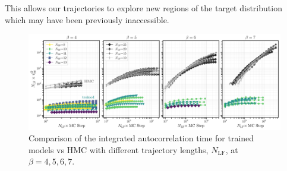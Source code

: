 \documentclass[a4paper,11pt]{article}
\begin{document}
%
This allows our trajectories to explore new regions of the target distribution
which may have been previously inaccessible.
%
\begin{figure}[htpb]
    \includegraphics[width=\textwidth]{assets/tint.pdf}
    \caption{\label{fig:tint}Comparison of the integrated autocorrelation time
        for trained models vs HMC with different trajectory lengths,
    \(N_{\mathrm{LF}}\), at \(\beta = 4, 5, 6, 7\).}
\end{figure}
%
\end{document}

